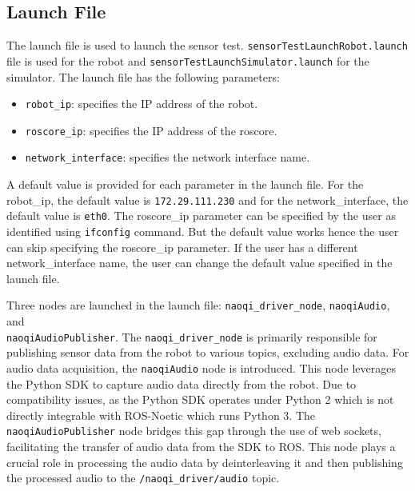 \documentclass{CSSRforAfrica}
\begin{document}
\subsection*{Launch File}
The launch file is used to launch the sensor test. \texttt{sensorTestLaunchRobot.launch} file is used for the robot and \texttt{sensorTestLaunchSimulator.launch} for the simulator. 
The launch file has the following parameters:
\begin{itemize}
	\setlength\itemsep{0em}
	\item \texttt{robot\_ip}: specifies the IP address of the robot.
	\item \texttt{roscore\_ip}: specifies the IP address of the roscore.
	\item \texttt{network\_interface}: specifies the network interface name.
\end{itemize}

A default value is provided for each parameter in the launch file. For the robot\_ip, the default value is 
\texttt{172.29.111.230} and for the network\_interface, the default value is \texttt{eth0}. The roscore\_ip 
parameter can be specified by the user as identified using \texttt{ifconfig} command. But the default value works
hence the user can skip specifying the roscore\_ip parameter. If the user has a different network\_interface name, the user
can change the default value specified in the launch file. 

Three nodes are launched in the launch file: \texttt{naoqi\_driver\_node}, \texttt{naoqiAudio}, and \\
\texttt{naoqiAudioPublisher}. 
The \texttt{naoqi\_driver\_node} is primarily responsible for publishing sensor data from the robot to various topics, 
excluding audio data. For audio data acquisition, the \texttt{naoqiAudio} node is introduced. This node leverages the Python SDK 
to capture audio data directly from the robot. Due to compatibility issues, as the Python SDK operates under 
Python 2 which is not directly integrable with ROS-Noetic which runs Python 3. The \texttt{naoqiAudioPublisher} node bridges this gap through 
the use of web sockets, facilitating the transfer of audio data from the SDK to ROS. This node plays a crucial role 
in processing the audio data by deinterleaving it and then publishing the processed audio to the \texttt{/naoqi\_driver/audio} topic. 

\newpage
\end{document}
